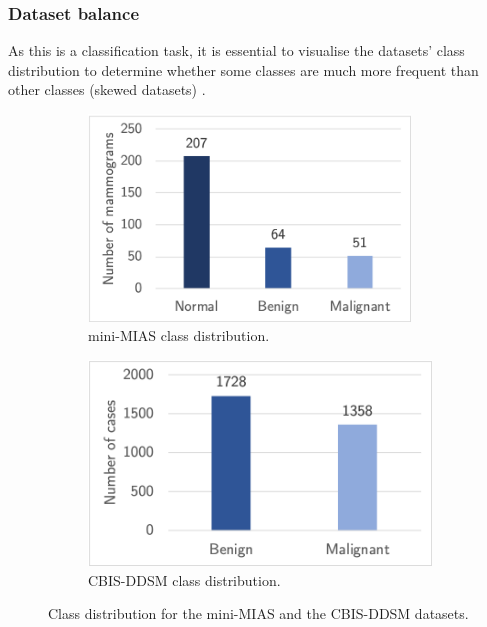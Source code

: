 \subsubsection{Dataset balance}
\label{sec:design-dataset-balance}

As this is a classification task, it is essential to visualise the datasets' class distribution to determine whether  some classes are much more frequent than other classes (skewed datasets) \citep{Geron2019}.

\begin{figure}[h]
\centering
\begin{subfigure}{.5\textwidth}
  \centering
  \includegraphics[width=0.94\textwidth]{figures/design/mini-mias-balance.png}
  \caption{mini-MIAS class distribution.}
  \label{fig:design-mini-mias-balance}
\end{subfigure}%
\begin{subfigure}{.5\textwidth}
  \centering
  \includegraphics[width=\textwidth]{figures/design/cbis-ddsm-balance.png}
  \caption{CBIS-DDSM class distribution.}
  \label{fig:cbis-ddsm-balance}
\end{subfigure}
\caption{\label{fig:design-datasets-balance}Class distribution for the mini-MIAS and the CBIS-DDSM datasets.}
\end{figure}

